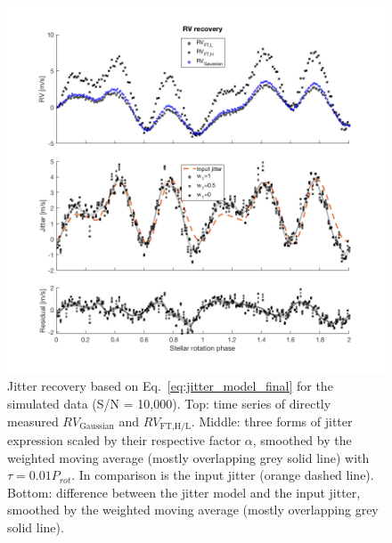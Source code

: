 \begin{figure}[tbp]
\centering
\includegraphics[width = 0.99 \linewidth]
{./Figures/Methods/5-PLANET_AND_JITTER2.png}
\caption[Jitter model]
{Jitter recovery based on Eq.~\ref{eq:jitter_model_final} for the simulated data (S/N = 10,000). Top: time series of directly measured $RV_\text{Gaussian}$ and $RV_\text{FT,H/L}$. Middle: three forms of jitter expression scaled by their respective factor $\alpha$, smoothed by the weighted moving average (mostly overlapping grey solid line) with $\tau = 0.01 P_{rot}$. In comparison is the input jitter (orange dashed line). Bottom: difference between the jitter model and the input jitter, smoothed by the weighted moving average (mostly overlapping grey solid line).}
\label{fig:PLANET_AND_JITTER}
\end{figure} 


